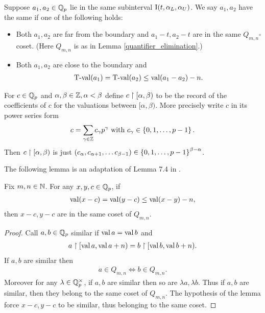 \documentclass{amsart}
\begin{document}
\begin{Definition}
  Suppose $a_1, a_2 \in \mathbb{Q}_p$ lie in the same subinterval $\operatorname{I}(t, \alpha_L, \alpha_U)$.
  We say $a_1, a_2$ have the same  if one of the following holds:
  \begin{itemize}
  \item Both $a_1, a_2$ are far from the boundary and $a_1 - t, a_2 - t$ are in the same $Q_{m,n}$-coset.
    (Here $Q_{m,n}$ is as in Lemma \ref{quantifier_elimination}.)
  \item Both $a_1, a_2$ are close to the boundary and 
    \begin{align*}
	  \operatorname{T-val}(a_1) = \operatorname{T-val}(a_2) \leq \operatorname{val}(a_1 - a_2) - n.
    \end{align*}
  \end{itemize}      
\end{Definition}


\begin{Definition}
	For $c \in \mathbb{Q}_p$ and $\alpha, \beta \in \mathbb{Z}, \alpha < \beta$ define $c \upharpoonright [\alpha, \beta)$
  to be the record of the coefficients of $c$ for the valuations between $[\alpha, \beta)$.
  More precisely write $c$ in its power series form
  \begin{align*}
    c = \sum_{\gamma \in \mathbb{Z}} c_\gamma p^\gamma \text{ with } c_\gamma \in \left\{0,1, \ldots, p-1\right\}.
  \end{align*}
  Then $c \upharpoonright [\alpha, \beta)$ is just $(c_\alpha, c_{\alpha+1}, \ldots c_{\beta - 1}) \in \left\{0,1, \ldots, p-1\right\}^{\beta - \alpha}$.
\end{Definition}

The following lemma is an adaptation of Lemma 7.4 in \cite{density}.
\begin{Lemma} \label{distance}
  Fix $m,n \in \mathbb{N}$.
  For any $x,y,c \in \mathbb{Q}_p$, if
  \begin{align*}
    \operatorname{val} (x - c) = \operatorname{val} (y - c) \leq \operatorname{val} (x - y) - n,
  \end{align*}
  then $x - c, y - c$ are in the same coset of $Q_{m,n}$.
\end{Lemma}
\begin{proof}
  Call $a,b \in \mathbb{Q}_p$ similar if $\operatorname{val} a = \operatorname{val} b$ and
  \begin{align*}
    a \upharpoonright [\operatorname{val} a, \operatorname{val} a + n) = b \upharpoonright [\operatorname{val} b, \operatorname{val} b + n).
  \end{align*}
  If $a,b$ are similar then
  \begin{align*}
    a \in Q_{m,n} \iff b \in Q_{m,n}.
  \end{align*}
  Moreover for any $\lambda \in \mathbb{Q}_p^\times$, if $a,b$ are similar then so are $\lambda a, \lambda b$.
  Thus if $a,b$ are similar, then they belong to the same coset of $Q_{m,n}$.
  The hypothesis of the lemma force $x - c, y - c$ to be similar, thus belonging to the same coset.
\end{proof} 
\end{document}
